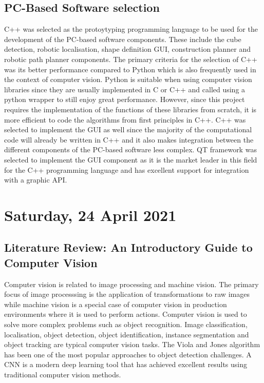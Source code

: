 \subsection{PC-Based Software selection}

C++ was selected as the protoytyping programming language to be used for the development of the PC-based software components. These include the cube detection, robotic localisation, shape definition \ac{GUI}, construction planner and robotic path planner components. The primary criteria for the selection of C++ was its better performance compared to Python which is also frequently used in the context of computer vision. Python is suitable when using computer vision libraries since they are usually implemented in C or C++ and called using a python wrapper to still enjoy great performance. However, since this project requires the implementation of the functions of these libraries from scratch, it is more efficient to code the algorithms from first principles in C++. C++ was selected to implement the \ac{GUI} as well since the majority of the computational code will already be written in C++ and it also makes integration between the different components of the PC-based software less complex. QT framework was selected to implement the \ac{GUI} component as it is the market leader in this field for the C++ programming language and has excellent support for integration with a graphic \ac{API}.

\pendsign

\section[2021/04/24]{Saturday, 24 April 2021}

\subsection{Literature Review: An Introductory Guide to Computer Vision \cite{tryolabs_resources_2019}}

Computer vision is related to image processing and machine vision. The primary focus of image processsing is the application of transformations to raw images while machine vision is a special case of computer vision in production environments where it is used to perform actions. Computer vision is used to solve more complex problems such as object recognition. Image classification, localisation, object detection, object identification, instance segmentation and object tracking are typical computer vision tasks. The Viola and Jones algorithm has been one of the most popular approaches to object detection challenges. A \ac{CNN} is a modern deep learning tool that has achieved excellent results using traditional computer vision methods.

